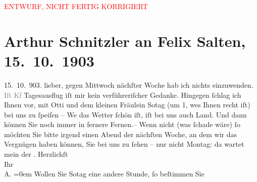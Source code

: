 
\begin{center}
            \textcolor{red}{ENTWURF, NICHT FERTIG KORRIGIERT}
                      \end{center}
            
         
         \renewcommand{\erwaehntePersonen}{Personen: Caroline Kotter, Felix Salten, Ottilie Salten}
         \renewcommand{\erwaehnteOrte}{Orte: Brünn, Wien}
         \renewcommand{\erwaehnteWerke}{}
               \section[Arthur Schnitzler an Felix Salten, 15. 10. 1903]{ Arthur Schnitzler an Felix Salten, 15. 10. 1903}\nopagebreak{}\rehead{ }\begin{ledgroupsized}[t]{13cm}\normalsize\beginnumbering \toendnotes[C]{\smallbreak\pagebreak[2]} 
\toendnotes[C]{\smallbreak}\pstart
           \raggedleft{}{\pb}15. 10. 903.\pend
           \pstart
           lieber, gegen Mittwoch nächſter Woche hab ich nichts einzuwenden.
                  \textcolor{gray}{Iſt Kf} Tagesausflug iſt mir kein verführeriſcher Gedanke.
               Hingegen ſchlag ich Ihnen vor, mit Otti und
               dem kleinen Fräulein So{\geminationn}tag (um 1, we{\geminationn}s {\pb}Ihnen recht iſt) bei uns zu ſpeiſen – We{\geminationn} das Wetter ſchön iſt, iſt bei uns auch Land. Und dann
               können Sie noch immer in fernere Fernen.– \pend
           \pstart
           Wenn nicht (was ſchade wäre) ſo möchten Sie bitte irgend einen Abend der {\pb}nächſten Woche, an dem wir das Vergnügen
               haben können, Sie bei uns zu ſehen – nur nicht Montag: da wartet mein der \label{K_L02985-12v}\label{K_L02985-12h}. \pend
           \pstart
           Herzlichſt {\\[\baselineskip]}Ihr {\\[\baselineskip]}\spacefill\mbox{A.}\pend
           \leftskip=0em{}\pstart
           {\pb}Wollen Sie So{\geminationn}tag eine andere Stunde, ſo beſtimmen Sie \pend
           

\end{ledgroupsized}
